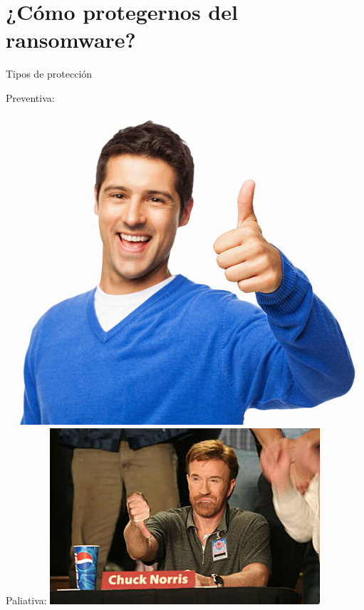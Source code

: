 \documentclass[10pt]{beamer}
\begin{document}
\section{¿Cómo protegernos del ransomware?}

\begin{frame}[fragile]{Tipos de protección}
	\begin{center}
		\pause
		Preventiva:
		\includegraphics[scale=0.2]{./Imagenes/ransomware5.jpg}
		\\
		\vspace*{20px}
		\pause
		Paliativa:
		\includegraphics[scale=0.3]{./Imagenes/ransomware6.jpg}
	\end{center}
\end{frame}
\end{document}
